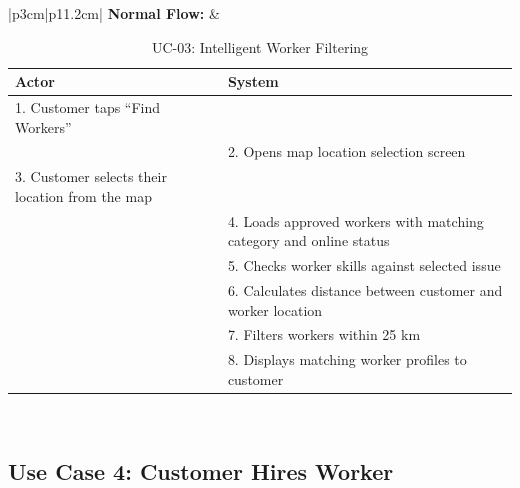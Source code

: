 {\small
\renewcommand{\arraystretch}{1.05}
\begin{table}[H]
\centering
\begin{tabular}{|p{3cm}|p{11.2cm}|}
\hline
\textbf{Normal Flow:} &
\begin{tabular}[t]{|p{5.4cm}|p{5.4cm}|}
\hline
\textbf{Actor} & \textbf{System} \\ \hline
1. Customer taps ``Find Workers'' & \\ \hline
 & 2. Opens map location selection screen \\ \hline
3. Customer selects their location from the map & \\ \hline
 & 4. Loads approved workers with matching category and online status \\ \hline
 & 5. Checks worker skills against selected issue \\ \hline
 & 6. Calculates distance between customer and worker location \\ \hline
 & 7. Filters workers within 25 km \\ \hline
 & 8. Displays matching worker profiles to customer \\ \hline
\end{tabular} \\ \hline
\end{tabular}
\caption{UC-03: Intelligent Worker Filtering}
\end{table}
}

\newpage

\subsection*{Use Case 4: Customer Hires Worker}

